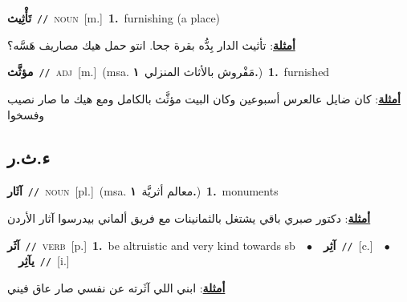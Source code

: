 \documentclass[10pt,a4paper,twoside]{article} %
\begin{document}
\begin{multicols}{2}
{\setlength\topsep{0pt}\textbf{\foreignlanguage{arabic}{تَأْثِيث}}\ {\color{gray}\texttt{//}\color{black}}\ \textsc{noun}\ [m.]\ \textbf{1.}~furnishing (a place)\  \begin{flushright}\color{gray}\foreignlanguage{arabic}{\textbf{\underline{\foreignlanguage{arabic}{أمثلة}}}: تأثيث الدار بِدُّه بقرة جحا. انتو حمل هيك مصاريف هَسَّه؟}\end{flushright}\color{black}} \vspace{2mm}

{\setlength\topsep{0pt}\textbf{\foreignlanguage{arabic}{مؤثَّث}}\ {\color{gray}\texttt{//}\color{black}}\ \textsc{adj}\ [m.]\ \color{gray}(msa. \foreignlanguage{arabic}{مَفْروش بالأثاث المنزلي}~\foreignlanguage{arabic}{\textbf{١.}})\color{black}\ \textbf{1.}~furnished\  \begin{flushright}\color{gray}\foreignlanguage{arabic}{\textbf{\underline{\foreignlanguage{arabic}{أمثلة}}}: كان ضايل عالعرس أسبوعين وكان البيت مؤثَّث بالكامل ومع هيك ما صار نصيب وفسخوا}\end{flushright}\color{black}} \vspace{2mm}

\vspace{-3mm}
\subsection*{\color{blue}\foreignlanguage{arabic}{ء.ث.ر}\color{blue}{}} 

{\setlength\topsep{0pt}\textbf{\foreignlanguage{arabic}{آثَار}}\ {\color{gray}\texttt{//}\color{black}}\ \textsc{noun}\ [pl.]\ \color{gray}(msa. \foreignlanguage{arabic}{معالم أثريَّة}~\foreignlanguage{arabic}{\textbf{١.}})\color{black}\ \textbf{1.}~monuments\  \begin{flushright}\color{gray}\foreignlanguage{arabic}{\textbf{\underline{\foreignlanguage{arabic}{أمثلة}}}: دكتور صبري باقي يشتغل بالثمانينات مع فريق ألماني بيدرسوا آثار الأردن}\end{flushright}\color{black}} \vspace{2mm}

{\setlength\topsep{0pt}\textbf{\foreignlanguage{arabic}{آثَر}}\ {\color{gray}\texttt{//}\color{black}}\ \textsc{verb}\ [p.]\ \textbf{1.}~be altruistic and very kind towards sb\ \ $\bullet$\ \ \setlength\topsep{0pt}\textbf{\foreignlanguage{arabic}{آثِر}}\ {\color{gray}\texttt{//}\color{black}}\ [c.]\ \ $\bullet$\ \ \setlength\topsep{0pt}\textbf{\foreignlanguage{arabic}{يآثِر}}\ {\color{gray}\texttt{//}\color{black}}\ [i.]\  \begin{flushright}\color{gray}\foreignlanguage{arabic}{\textbf{\underline{\foreignlanguage{arabic}{أمثلة}}}: ابني اللي آثَرته عن نفسي صار عاق فيني}\end{flushright}\color{black}} \vspace{2mm}


\end{multicols}
\end{document}

